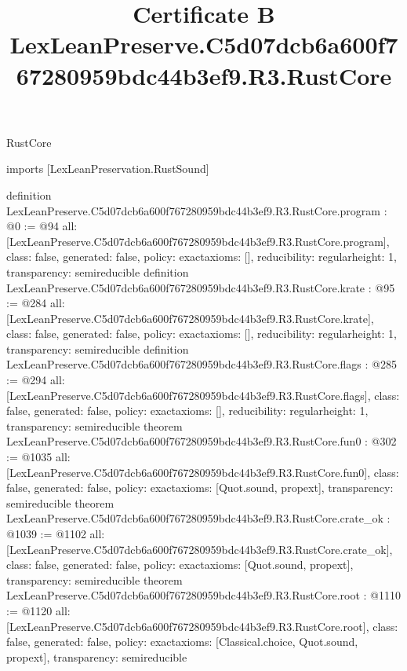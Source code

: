 \begin{lexlean}{RustCore}
\title{Certificate B LexLeanPreserve.C5d07dcb6a600f767280959bdc44b3ef9.R3.RustCore}
\begin{coremodule}
imports [LexLeanPreservation.RustSound]

definition LexLeanPreserve.C5d07dcb6a600f767280959bdc44b3ef9.R3.RustCore.program : @0 := @94 {
  all: [LexLeanPreserve.C5d07dcb6a600f767280959bdc44b3ef9.R3.RustCore.program],
  class: false,
  generated: false,
  policy: exact{axioms: []},
  reducibility: regular{height: 1},
  transparency: semireducible
}
definition LexLeanPreserve.C5d07dcb6a600f767280959bdc44b3ef9.R3.RustCore.krate : @95 := @284 {
  all: [LexLeanPreserve.C5d07dcb6a600f767280959bdc44b3ef9.R3.RustCore.krate],
  class: false,
  generated: false,
  policy: exact{axioms: []},
  reducibility: regular{height: 1},
  transparency: semireducible
}
definition LexLeanPreserve.C5d07dcb6a600f767280959bdc44b3ef9.R3.RustCore.flags : @285 := @294 {
  all: [LexLeanPreserve.C5d07dcb6a600f767280959bdc44b3ef9.R3.RustCore.flags],
  class: false,
  generated: false,
  policy: exact{axioms: []},
  reducibility: regular{height: 1},
  transparency: semireducible
}
theorem LexLeanPreserve.C5d07dcb6a600f767280959bdc44b3ef9.R3.RustCore.fun0 : @302 := @1035 {
  all: [LexLeanPreserve.C5d07dcb6a600f767280959bdc44b3ef9.R3.RustCore.fun0],
  class: false,
  generated: false,
  policy: exact{axioms: [Quot.sound, propext]},
  transparency: semireducible
}
theorem LexLeanPreserve.C5d07dcb6a600f767280959bdc44b3ef9.R3.RustCore.crate_ok : @1039 := @1102 {
  all: [LexLeanPreserve.C5d07dcb6a600f767280959bdc44b3ef9.R3.RustCore.crate_ok],
  class: false,
  generated: false,
  policy: exact{axioms: [Quot.sound, propext]},
  transparency: semireducible
}
theorem LexLeanPreserve.C5d07dcb6a600f767280959bdc44b3ef9.R3.RustCore.root : @1110 := @1120 {
  all: [LexLeanPreserve.C5d07dcb6a600f767280959bdc44b3ef9.R3.RustCore.root],
  class: false,
  generated: false,
  policy: exact{axioms: [Classical.choice, Quot.sound, propext]},
  transparency: semireducible
}


\end{coremodule}
\end{lexlean}
